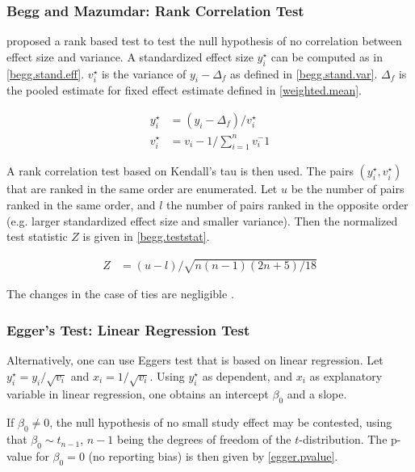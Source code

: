 \documentclass[11pt,a4paper,twoside]{book}\usepackage[]{graphicx}\usepackage[]{color}
\begin{document}
\subsubsection{Begg and Mazumdar: Rank Correlation Test}
\citet{begg.ties} proposed a rank based test to test the null hypothesis of no correlation between effect size and variance.
A standardized effect size $y_{i}^\star$ can be computed as in \ref{begg.stand.eff}. $v_{i}^\star$ is the variance of $y_{i} - \Delta_{f}$ as defined in \ref{begg.stand.var}. $\Delta_{f}$ is the pooled estimate for fixed effect estimate defined in \ref{weighted.mean}. 

\begin{align}
y_{i}^\star &= (y_{i} - \Delta_{f})/v_{i}^\star \label{begg.stand.eff} \\
v_{i}^\star &= v_{i} - 1/\sum_{i = 1}^n v_{i}^-1 \label{begg.stand.var} 
\end{align}

A rank correlation test based on Kendall's tau is then used. The pairs $(y_{i}^\star, v_{i}^\star)$ that are ranked in the same order are enumerated. Let $u$ be the number of pairs ranked in the same order, and $l$ the number of pairs ranked in the opposite order (e.g. larger standardized effect size and smaller variance). Then the normalized test statistic $Z$ is given in \ref{begg.teststat}. 

\begin{align}
Z &= (u - l)/\sqrt{n(n-1)(2n + 5)/18} \label{begg.teststat}
\end{align}

The changes in the case of ties are negligible \cite[410]{begg.ties}.

\subsubsection{Egger's Test: Linear Regression Test}
Alternatively, one can use Eggers test \citep{Egger} that is based on linear regression. Let $y_{i}^\star = y_{i}/\sqrt{v_{i}}$ and $x_{i} = 1/\sqrt{v_{i}}$. 
Using $y_{i}^\star$ as dependent, and  $x_{i}$ as explanatory variable in linear regression, one obtains an intercept $\beta_{0}$ and a slope. 

\vspace{0mm}
If $\beta_{0} \ne 0$, the null hypothesis of no small study effect may be contested, using that $\beta_{0} \sim t_{n-1}$, $n-1$ being the degrees of freedom of the $t$-distribution. The p-value for $\beta_{0} = 0$ (no reporting bias) is then given by \ref{egger.pvalue}.
\end{document}
